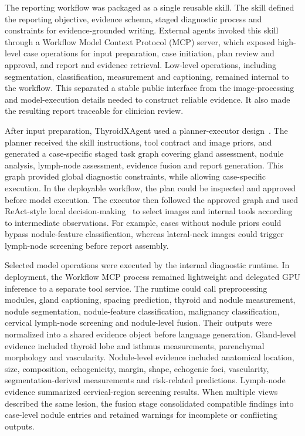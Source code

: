 \documentclass[fleqn,10pt]{wlscirep}
\begin{document}
The reporting workflow was packaged as a single reusable skill. The skill defined the reporting objective, evidence schema, staged diagnostic process and constraints for evidence-grounded writing. External agents invoked this skill through a Workflow Model Context Protocol (MCP) server, which exposed high-level case operations for input preparation, case initiation, plan review and approval, and report and evidence retrieval. Low-level operations, including segmentation, classification, measurement and captioning, remained internal to the workflow. This separated a stable public interface from the image-processing and model-execution details needed to construct reliable evidence. It also made the resulting report traceable for clinician review.

After input preparation, ThyroidXAgent used a planner-executor design~\cite{wang_plan-and-solve_2023}. The planner received the skill instructions, tool contract and image priors, and generated a case-specific staged task graph covering gland assessment, nodule analysis, lymph-node assessment, evidence fusion and report generation. This graph provided global diagnostic constraints, while allowing case-specific execution. In the deployable workflow, the plan could be inspected and approved before model execution. The executor then followed the approved graph and used ReAct-style local decision-making~\cite{yao_react:_2022} to select images and internal tools according to intermediate observations. For example, cases without nodule priors could bypass nodule-feature classification, whereas lateral-neck images could trigger lymph-node screening before report assembly.

Selected model operations were executed by the internal diagnostic runtime. In deployment, the Workflow MCP process remained lightweight and delegated GPU inference to a separate tool service. The runtime could call preprocessing modules, gland captioning, spacing prediction, thyroid and nodule measurement, nodule segmentation, nodule-feature classification, malignancy classification, cervical lymph-node screening and nodule-level fusion. Their outputs were normalized into a shared evidence object before language generation. Gland-level evidence included thyroid lobe and isthmus measurements, parenchymal morphology and vascularity. Nodule-level evidence included anatomical location, size, composition, echogenicity, margin, shape, echogenic foci, vascularity, segmentation-derived measurements and risk-related predictions. Lymph-node evidence summarized cervical-region screening results. When multiple views described the same lesion, the fusion stage consolidated compatible findings into case-level nodule entries and retained warnings for incomplete or conflicting outputs.
\end{document}
